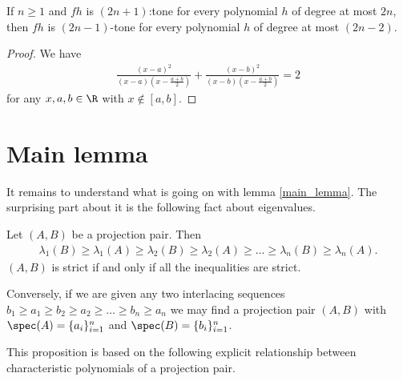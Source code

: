 \begin{lem}\label{k_tone_cor}
	If $n \geq 1$ and $f h$ is $(2 n + 1)$:tone for every polynomial $h$ of degree at most $2 n$, then $f h$ is $(2 n - 1)$-tone for every polynomial $h$ of degree at most $(2 n - 2)$.
\end{lem}

\begin{proof}
	We have
	\begin{align*}
		\frac{(x - a)^2}{(x - a) (x - \frac{a + b}{2})} + \frac{(x - b)^2}{(x - b) (x - \frac{a + b}{2})} = 2
	\end{align*}
	for any $x, a, b \in \R$ with $x \notin [a, b]$.
\end{proof}

\section{Main lemma}

It remains to understand what is going on with lemma \ref{main_lemma}. The surprising part about it is the following fact about eigenvalues.

\begin{lem}\label{projection_eigenvalues}
	Let $(A, B)$ be a projection pair. Then
	\begin{align*}
		\lambda_{1}(B) \geq \lambda_{1}(A) \geq \lambda_{2}(B) \geq \lambda_{2}(A) \geq \ldots \geq \lambda_{n}(B) \geq \lambda_{n}(A).
	\end{align*}
	$(A, B)$ is strict if and only if all the inequalities are strict.

	Conversely, if we are given any two interlacing sequences $b_{1} \geq a_{1} \geq b_{2} \geq a_{2} \geq \ldots \geq b_{n} \geq a_{n}$ we may find a projection pair $(A, B)$ with $\spec(A) = \{a_{i}\}_{i = 1}^{n}$ and $\spec(B) = \{b_{i}\}_{i = 1}^{n}$.
\end{lem}

This proposition is based on the following explicit relationship between characteristic polynomials of a projection pair.

